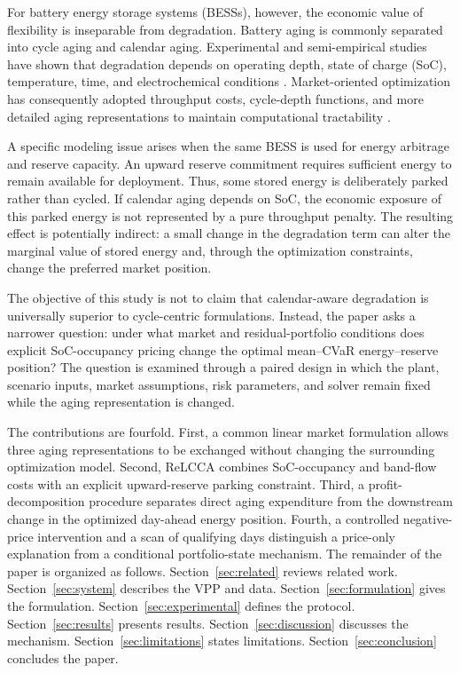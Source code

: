 \documentclass[journal,12pt,twocolumn]{IEEEtran}
\begin{document}
For battery energy storage systems (BESSs), however, the economic value of flexibility is inseparable from degradation. Battery aging is commonly separated into cycle aging and calendar aging. Experimental and semi-empirical studies have shown that degradation depends on operating depth, state of charge (SoC), temperature, time, and electrochemical conditions \cite{Vetter2005,Broussely2005,Barre2013,Keil2016,Schmalstieg2014,Naumann2018}. Market-oriented optimization has consequently adopted throughput costs, cycle-depth functions, and more detailed aging representations to maintain computational tractability \cite{Hesse2019,Xu2018a,Xu2018b,Shi2019,Petrin2025,Kumtepeli2020}.

A specific modeling issue arises when the same BESS is used for energy arbitrage and reserve capacity. An upward reserve commitment requires sufficient energy to remain available for deployment. Thus, some stored energy is deliberately parked rather than cycled. If calendar aging depends on SoC, the economic exposure of this parked energy is not represented by a pure throughput penalty. The resulting effect is potentially indirect: a small change in the degradation term can alter the marginal value of stored energy and, through the optimization constraints, change the preferred market position.

The objective of this study is not to claim that calendar-aware degradation is universally superior to cycle-centric formulations. Instead, the paper asks a narrower question: under what market and residual-portfolio conditions does explicit SoC-occupancy pricing change the optimal mean--CVaR energy--reserve position? The question is examined through a paired design in which the plant, scenario inputs, market assumptions, risk parameters, and solver remain fixed while the aging representation is changed.

The contributions are fourfold. First, a common linear market formulation allows three aging representations to be exchanged without changing the surrounding optimization model. Second, ReLCCA combines SoC-occupancy and band-flow costs with an explicit upward-reserve parking constraint. Third, a profit-decomposition procedure separates direct aging expenditure from the downstream change in the optimized day-ahead energy position. Fourth, a controlled negative-price intervention and a scan of qualifying days distinguish a price-only explanation from a conditional portfolio-state mechanism. The remainder of the paper is organized as follows. Section~\ref{sec:related} reviews related work. Section~\ref{sec:system} describes the VPP and data. Section~\ref{sec:formulation} gives the formulation. Section~\ref{sec:experimental} defines the protocol. Section~\ref{sec:results} presents results. Section~\ref{sec:discussion} discusses the mechanism. Section~\ref{sec:limitations} states limitations. Section~\ref{sec:conclusion} concludes the paper.
\end{document}
